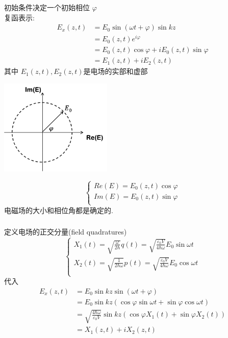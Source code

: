 \begin{frame}
 \frametitle{}
 初始条件决定一个初始相位 $ \varphi$ \\ 
  {\Bullet}复函表示:  \[
    \begin{aligned}
         E_{x}(z, t) &= E_{0} \sin (\omega t+\varphi) \sin k z \\
         &=E_{0} (z,t) e^ {i\varphi}  \\
         &=  E_{0}(z,t) \cos\varphi  + i E_{0}(z,t) \sin\varphi \\ 
         &= E_1 (z,t) + i E_2 (z,t)
    \end{aligned}
    \]
  其中 $E_1(z,t), E_2(z,t) $是电场的实部和虚部 \\   
\end{frame}

\begin{frame}
   \begin{center}
      \includegraphics[width=0.4\textwidth]{figs/2.png}
   \end{center}
 \[ \begin{cases}
  Re(E)= E_{0}(z,t) \cos\varphi\\ 
  Im(E)= E_{0}(z,t) \sin\varphi\\ 
 \end{cases} \]
 电磁场的大小和相位角都是确定的.  
\end{frame}

\begin{frame}
  \frametitle{}
  定义电场的正交分量(field quadratures)
  \[ \begin{cases}
    X_{1}(t) = \sqrt{\frac{\omega}{2\hbar}}q(t)= \sqrt{\frac{\varepsilon_{0} V}{4 \hbar \omega}} {E}_{0} \sin \omega t\\ 
    X_{2}(t) = \sqrt{\frac{1}{2\hbar \omega}}p(t)= \sqrt{\frac{\varepsilon_{0} V}{4 \hbar \omega}} {E}_{0} \cos \omega t\\ 
   \end{cases} \]
   代入
   \[
  \begin{aligned}
       E_{x}(z, t) &=E_{0} \sin k z \sin (\omega t + \varphi) \\
       &=  E_{0} \sin k z (\cos\varphi \sin\omega t + \sin\varphi \cos\omega t) \\ 
       &= \sqrt{\frac{4 \hbar \omega}{\varepsilon_{0} V}} \sin k z\left(\cos \varphi X_{1}(t)+\sin \varphi X_{2}(t)\right) \\ 
       &=  X_{1}(z,t)+ i X_{2}(z,t)
  \end{aligned}
  \]
\end{frame}


